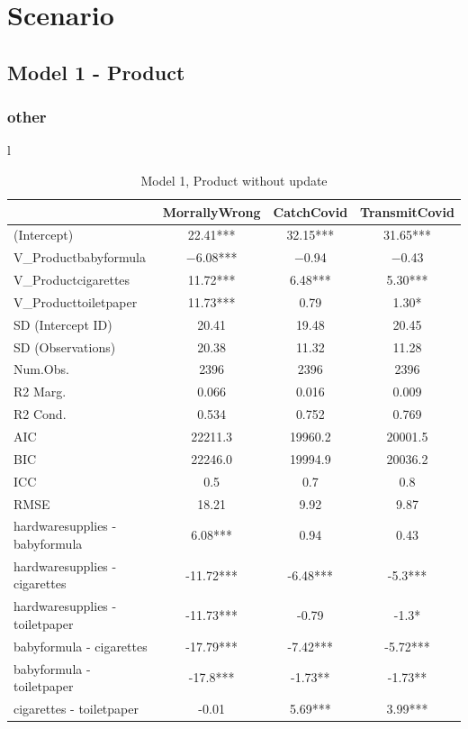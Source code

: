 \documentclass[]{report}
\begin{document}
\part{Scenario}


\chapter{Model 1 - Product}

\section{other}
l

\begin{table}
	
	\caption{Model 1, Product without update}
	\centering
	\begin{tabular}[t]{lccc}
		\toprule
		& MorrallyWrong & CatchCovid & TransmitCovid\\
		\midrule
		(Intercept) & \num{22.41}*** & \num{32.15}*** & \num{31.65}***\\
		V\_Productbabyformula & \num{-6.08}*** & \num{-0.94} & \num{-0.43}\\
		V\_Productcigarettes & \num{11.72}*** & \num{6.48}*** & \num{5.30}***\\
		V\_Producttoiletpaper & \num{11.73}*** & \num{0.79} & \num{1.30}*\\
		SD (Intercept ID) & \num{20.41} & \num{19.48} & \num{20.45}\\
		SD (Observations) & \num{20.38} & \num{11.32} & \num{11.28}\\
		\midrule
		Num.Obs. & \num{2396} & \num{2396} & \num{2396}\\
		R2 Marg. & \num{0.066} & \num{0.016} & \num{0.009}\\
		R2 Cond. & \num{0.534} & \num{0.752} & \num{0.769}\\
		AIC & \num{22211.3} & \num{19960.2} & \num{20001.5}\\
		BIC & \num{22246.0} & \num{19994.9} & \num{20036.2}\\
		ICC & \num{0.5} & \num{0.7} & \num{0.8}\\
		RMSE & \num{18.21} & \num{9.92} & \num{9.87}\\
		\toprule
hardwaresupplies - babyformula & 6.08*** & 0.94 & 0.43 \\ 
hardwaresupplies - cigarettes & -11.72*** & -6.48*** & -5.3*** \\ 
hardwaresupplies - toiletpaper & -11.73*** & -0.79 & -1.3* \\ 
babyformula - cigarettes & -17.79*** & -7.42*** & -5.72*** \\ 
babyformula - toiletpaper & -17.8*** & -1.73** & -1.73** \\ 
cigarettes - toiletpaper & -0.01 & 5.69*** & 3.99*** \\ 
		\bottomrule
	\end{tabular}
\end{table}
\end{document}
